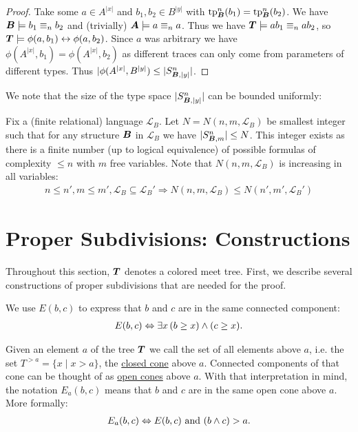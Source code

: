\documentclass{amsart}
\DeclareMathOperator{\TT}{\boldface T}
\DeclareMathOperator{\AT}{\boldface A}
\DeclareMathOperator{\BT}{\boldface B}
\renewcommand{\LL}{\mathcal L}
\newcommand{\defn}{\underline}
\begin{document}
\begin{proof}
  Take some $a \in A^{|x|}$ and $b_1, b_2 \in B^{|y|}$ with $\tp^n_{\BT}(b_1) = \tp^n_{\BT}(b_2)$. We have $\BT \models b_1 \equiv_n b_2$ and (trivially) $\AT \models a \equiv_n a$. Thus  we have $\TT \models ab_1 \equiv_n ab_2$, so $\TT \models \phi(a, b_1) \leftrightarrow \phi(a, b_2)$. Since $a$ was arbitrary we have $\phi(A^{|x|}, b_1) = \phi(A^{|x|}, b_2)$ as different traces can only come from parameters of different types. Thus $|\phi(A^{|x|}, B^{|y|}) \leq |S^n_{\BT, |y|}|$.
\end{proof}

We note that the size of the type space $|S^n_{\BT, |y|}|$ can be bounded uniformly:

\begin{Definition} \label{def_type_count}
  Fix a (finite relational) language $\LL_B$. Let $N = N(n, m, \LL_B)$ be smallest integer such that for any structure $\BT$ in $\LL_B$ we have $|S^n_{\BT, m}| \leq N$. This integer exists as there is a finite number (up to logical equivalence) of possible formulas of complexity $\leq n$ with $m$ free variables.
  Note that $N(n, m, \LL_B)$ is increasing in all variables:
  \begin{align*}
    n \leq n', m \leq m', \LL_B \subseteq \LL_B' \Rightarrow N(n, m, \LL_B) \leq N(n', m', \LL_B')
  \end{align*}
\end{Definition}

\section{Proper Subdivisions: Constructions}

Throughout this section, $\TT$ denotes a colored meet tree.
First, we describe several constructions of proper subdivisions that are needed for the proof. 

\begin{Definition}
  We use $E(b,c)$ to express that $b$ and $c$ are in the same connected component:
  \begin{align*}
    E(b, c) \Leftrightarrow \exists x \, (b \geq x) \wedge (c \geq x).
  \end{align*}
\end{Definition}
\begin{Definition}
  Given an element $a$ of the tree $\TT$ we call the set of all elements above $a$, i.e. the set $T^{> a} = \{x \mid x > a\}$,
  the \defn{closed cone} above $a$.
  Connected components of that cone can be thought of as \defn{open cones} above $a$.
  With that interpretation in mind, the notation $E_a(b, c)$ means that $b$ and $c$ are in the same open cone above $a$. More formally:
  \begin{align*}
    E_a(b, c) \Leftrightarrow E(b,c) \text{ and } (b \wedge c) > a.
  \end{align*}
\end{Definition}
\end{document}
